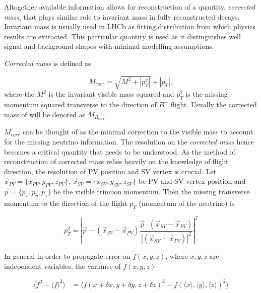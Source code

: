 Altogether available information allows for reconstruction of a quantity, \textit{corrected mass}, that plays similar role to invariant mass in fully reconstructed decays. Invariant mass is usually used in \gls{LHCb} as fitting distribution from which physics results are extracted. This particular quantity is used as it distinguishes well signal and background shapes with minimal modelling assumptions.

\textit{Corrected mass} is defined as

\begin{equation}
	M_{corr} = \sqrt{{M}^{2} + |p^{2}_{T}|} + |p_{T}|,
\end{equation}	
where the $M^{2}$ is the invariant visible mass squared and $p^{2}_{T}$ is the missing momentum squared transverse to the direction of $B^{+}$ flight. Usually the corrected mass of \Bpm will be denoted as $M_{B_{corr}}$.


$M_{corr}$ can be thought of as the minimal correction to the visible mass to account for the missing neutrino information. The resolution on the \textit{corrected mass} hence becomes a critical quantity that needs to be understood. As the method of reconstruction of corrected mass relies heavily on the knowledge of \Bpm flight direction, the resolution of \gls{PV} position and \gls{SV} vertex is crucial. Let $\vec{{x}}_{PV}=\{x_{PV},y_{PV},z_{PV}\}$, $\vec{{x}}_{SV}=\{x_{SV},y_{SV},z_{SV}\} $ be \gls{PV} and \gls{SV} vertex position and $\vec{p}=\{p_{x},p_{y},p_{z}\}$ be the visible trimuon momentum. Then the missing transverse momentum to the direction of the flight $p_{T}$ (momentum of the neutrino) is


\begin{equation}
	p^{2}_{T} = |\vec{p} - (\vec{{x}}_{SV}-\vec{{x}}_{PV})\frac{\vec{p} \cdot(\vec{{x}}_{SV}-\vec{{x}}_{PV})}{|(\vec{{x}}_{SV}-\vec{{x}}_{PV})|^{2}}|^{2}
\end{equation}

In general in order to propagate error on $f(x,y,z)$, where $x,y,z$ are independent variables, the variance of $f(x,y,z)$

\begin{equation}
\begin{aligned}
	\langle f^{2}-\langle f \rangle^{2} \rangle  &=  \langle f(x+\delta x, y+\delta y, z+\delta z)^{2} - f(\langle x \rangle, \langle y \rangle, \langle z \rangle)^{2} \rangle \\
\end{aligned}
\end{equation}

